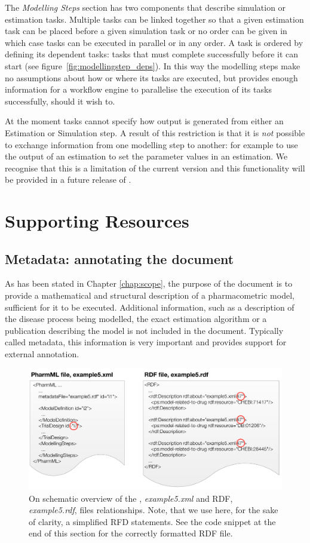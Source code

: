 The \emph{Modelling Steps} section has two components that describe
simulation or estimation tasks. Multiple tasks can be linked together so
that a given estimation task can be placed before a given simulation
task or no order can be given in which case tasks can be executed in
parallel or in any order. A task is ordered by defining its dependent
tasks: tasks that must complete successfully before it can start (see
figure~\ref{fig:modellingstep_deps}). In this way the modelling steps
make no assumptions about how or where its tasks are executed, but
provides enough information for a workflow engine to parallelise the
execution of its tasks successfully, should it wish to.

At the moment tasks cannot specify how output is generated from either
an Estimation or Simulation step. A result of this restriction is that
it is \emph{not} possible to exchange information from one modelling
step to another: for example to use the output of an estimation to set
the parameter values in an estimation. We recognise that this is a
limitation of the current version and this functionality will be
provided in a future release of \pharmml.


\section{Supporting Resources}
\label{sec:supporting-res}

\subsection{Metadata: annotating the \pharmml document}
\label{sec:annotation}

As has been stated in Chapter \ref{chap:scope}, the purpose of
the \pharmml document is to provide a mathematical and structural
description of a pharmacometric model, sufficient for it to be
executed. Additional information, such as a description of the disease
process being modelled, the exact estimation algorithm or a
publication describing the model is not included in the \pharmml
document. Typically called metadata, this information is very 
important and \pharmml provides support for external annotation.

\begin{figure}[htbp]
\centering
\includegraphics[width=0.8\linewidth]{pics/PharmML_RDF.pdf}
\caption{On schematic overview of the \pml, \emph{example5.xml} and RDF, 
\emph{example5.rdf}, files relationships. Note, that we use here, for the sake of clarity, 
a simplified RFD statements. See the code snippet at the end of this section 
for the correctly formatted RDF file.}
\label{fig:pharmmlRdf}
\end{figure}

